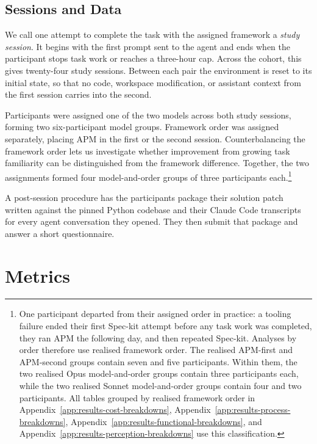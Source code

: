 \subsection{Sessions and Data}
\label{sec:evaluation-sessions-data}

We call one attempt to complete the task with the assigned framework a \emph{study session}. It begins with the first prompt sent to the agent and ends when the participant stops task work or reaches a three-hour cap. Across the cohort, this gives twenty-four study sessions. Between each pair the environment is reset to its initial state, so that no code, workspace modification, or assistant context from the first session carries into the second.

Participants were assigned one of the two models across both study sessions, forming two six-participant model groups. Framework order was assigned separately, placing APM in the first or the second session. Counterbalancing the framework order lets us investigate whether improvement from growing task familiarity can be distinguished from the framework difference. Together, the two assignments formed four model-and-order groups of three participants each.\footnote{\label{fn:evaluation-realised-order}One participant departed from their assigned order in practice: a tooling failure ended their first Spec-kit attempt before any task work was completed, they ran APM the following day, and then repeated Spec-kit. Analyses by order therefore use realised framework order. The realised APM-first and APM-second groups contain seven and five participants. Within them, the two realised Opus model-and-order groups contain three participants each, while the two realised Sonnet model-and-order groups contain four and two participants. All tables grouped by realised framework order in Appendix~\ref{app:results-cost-breakdowns}, Appendix~\ref{app:results-process-breakdowns}, Appendix~\ref{app:results-functional-breakdowns}, and Appendix~\ref{app:results-perception-breakdowns} use this classification.}

A post-session procedure has the participants package their solution patch written against the pinned Python codebase and their Claude Code transcripts for every agent conversation they opened. They then submit that package and answer a short questionnaire.

\section{Metrics}
\label{sec:evaluation-metrics}

